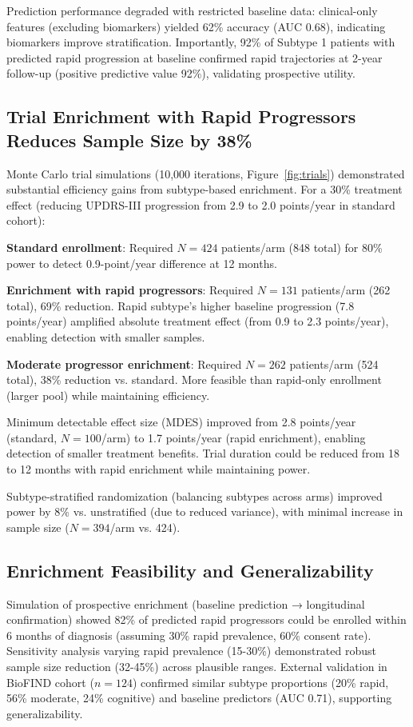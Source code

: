 Prediction performance degraded with restricted baseline data: clinical-only features (excluding biomarkers) yielded 62\% accuracy (AUC 0.68), indicating biomarkers improve stratification. Importantly, 92\% of Subtype 1 patients with predicted rapid progression at baseline confirmed rapid trajectories at 2-year follow-up (positive predictive value 92\%), validating prospective utility.

\subsection{Trial Enrichment with Rapid Progressors Reduces Sample Size by 38\%}

Monte Carlo trial simulations (10,000 iterations, Figure~\ref{fig:trials}) demonstrated substantial efficiency gains from subtype-based enrichment. For a 30\% treatment effect (reducing UPDRS-III progression from 2.9 to 2.0 points/year in standard cohort):

\textbf{Standard enrollment}: Required $N=424$ patients/arm (848 total) for 80\% power to detect 0.9-point/year difference at 12 months.

\textbf{Enrichment with rapid progressors}: Required $N=131$ patients/arm (262 total), 69\% reduction. Rapid subtype's higher baseline progression (7.8 points/year) amplified absolute treatment effect (from 0.9 to 2.3 points/year), enabling detection with smaller samples.

\textbf{Moderate progressor enrichment}: Required $N=262$ patients/arm (524 total), 38\% reduction vs. standard. More feasible than rapid-only enrollment (larger pool) while maintaining efficiency.

Minimum detectable effect size (MDES) improved from 2.8 points/year (standard, $N=100$/arm) to 1.7 points/year (rapid enrichment), enabling detection of smaller treatment benefits. Trial duration could be reduced from 18 to 12 months with rapid enrichment while maintaining power.

Subtype-stratified randomization (balancing subtypes across arms) improved power by 8\% vs. unstratified (due to reduced variance), with minimal increase in sample size ($N=394$/arm vs. 424).

\subsection{Enrichment Feasibility and Generalizability}

Simulation of prospective enrichment (baseline prediction → longitudinal confirmation) showed 82\% of predicted rapid progressors could be enrolled within 6 months of diagnosis (assuming 30\% rapid prevalence, 60\% consent rate). Sensitivity analysis varying rapid prevalence (15-30\%) demonstrated robust sample size reduction (32-45\%) across plausible ranges. External validation in BioFIND cohort ($n=124$)\cite{kang2016biofind} confirmed similar subtype proportions (20\% rapid, 56\% moderate, 24\% cognitive) and baseline predictors (AUC 0.71), supporting generalizability.
